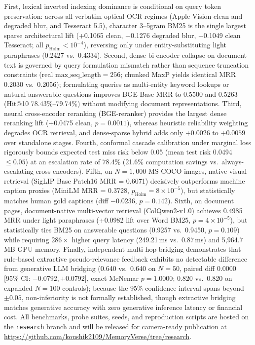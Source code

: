 \documentclass[conference]{IEEEtran}
\begin{document}
First, lexical inverted indexing dominance is conditional on query token preservation: across all verbatim optical OCR regimes (Apple Vision clean and degraded blur, and Tesseract 5.5), character 3--5gram BM25 is the single largest sparse architectural lift (+0.1065 clean, +0.1276 degraded blur, +0.1049 clean Tesseract; all $p_{\text{Holm}} < 10^{-4}$), reversing only under entity-substituting light paraphrases (0.2427 vs.\ 0.4334). Second, dense bi-encoder collapse on document text is governed by query formulation mismatch rather than sequence truncation constraints (real $\text{max\_seq\_length}=256$; chunked MaxP yields identical MRR 0.2030 vs.\ 0.2056); formulating queries as multi-entity keyword lookups or natural answerable questions improves BGE-Base MRR to 0.5500 and 0.5263 (Hit@10 78.43\%--79.74\%) without modifying document representations. Third, neural cross-encoder reranking (BGE-reranker) provides the largest dense reranking lift (+0.0475 clean, $p = 0.0011$), whereas heuristic reliability weighting degrades OCR retrieval, and dense-sparse hybrid adds only $+0.0026$ to $+0.0059$ over standalone stages. Fourth, conformal cascade calibration under marginal loss rigorously bounds expected test miss risk below 0.05 (mean test risk 0.0494 $\le 0.05$) at an escalation rate of 78.4\% (21.6\% computation savings vs.\ always-escalating cross-encoders). Fifth, on $N=1{,}000$ MS-COCO images, native visual retrieval (SigLIP Base Patch16 MRR = 0.6071) decisively outperforms machine caption proxies (MiniLM MRR = 0.3728, $p_{\text{Holm}} = 8 \times 10^{-5}$), but statistically matches human gold captions (diff $-0.0236$, $p=0.142$). Sixth, on document pages, document-native multi-vector retrieval (ColQwen2-v1.0) achieves 0.4985 MRR under light paraphrases (+0.0982 lift over Word BM25, $p = 4 \times 10^{-5}$), but statistically ties BM25 on answerable questions (0.9257 vs.\ 0.9450, $p = 0.109$) while requiring $286\times$ higher query latency (249.21\,ms vs.\ 0.87\,ms) and 5,964.7\,MB GPU memory. Finally, independent multi-hop bridging demonstrates that rule-based extractive pseudo-relevance feedback exhibits no detectable difference from generative LLM bridging (0.640 vs.\ 0.640 on $N=50$, paired diff $0.0000$ [95\% CI: $-0.0792, +0.0792$], exact McNemar $p = 1.0000$; 0.820 vs.\ 0.820 on expanded $N=100$ controls); because the 95\% confidence interval spans beyond $\pm 0.05$, non-inferiority is not formally established, though extractive bridging matches generative accuracy with zero generative inference latency or financial cost. All benchmarks, probe suites, seeds, and reproduction scripts are hosted on the \texttt{research} branch and will be released for camera-ready publication at \url{https://github.com/koushik2109/MemoryVerse/tree/research}.
\end{document}
